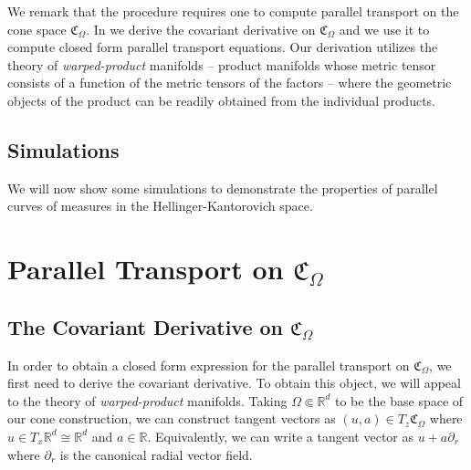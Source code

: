 \documentclass[11pt]{article}
\begin{document}
We remark that the procedure requires one to compute parallel transport on the cone space $\mathfrak{C}_\Omega$. In  we derive the covariant derivative on $\mathfrak{C}_\Omega$ and we use it to compute closed form parallel transport equations. Our derivation utilizes the theory of \textit{warped-product} manifolds -- product manifolds whose metric tensor consists of a function of the metric tensors of the factors -- where the geometric objects of the product can be readily obtained from the individual products.  

\subsection{Simulations}

We will now show some simulations to demonstrate the properties of parallel curves of measures in the Hellinger-Kantorovich space. 

\clearpage
\appendix

\section{Parallel Transport on $\mathfrak{C}_\Omega$} \label{sec: cone parallel transport}

\subsection{The Covariant Derivative on $\mathfrak{C}_\Omega$}

In order to obtain a closed form expression for the parallel transport on $\mathfrak{C}_\Omega$, we first need to derive the covariant derivative. To obtain this object, we will appeal to the theory of \textit{warped-product} manifolds.
Taking $\Omega \Subset \mathbb{R}^d$ to be the base space of our cone construction, we can construct tangent vectors as $(u, a) \in T_{z}\mathfrak{C}_\Omega$ where $u \in T_x\mathbb{R}^d \cong \mathbb{R}^d$ and $a \in \mathbb{R}$. Equivalently, we can write a tangent vector as $u + a\partial_r$ where $\partial_r$ is the canonical radial vector field. 
 
\end{document}
